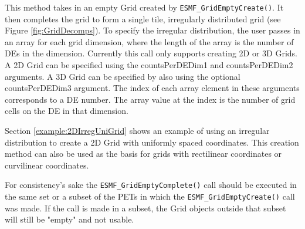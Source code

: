   
   This method takes in an empty Grid created by {\tt ESMF\_GridEmptyCreate()}.
   It then completes the grid to form a single tile, irregularly distributed grid
   (see Figure \ref{fig:GridDecomps}). To specify the irregular distribution, the user passes in an array
   for each grid dimension, where the length of the array is the number
   of DEs in the dimension. Currently this call only
   supports creating 2D or 3D Grids. A 2D Grid can be specified using the
   countsPerDEDim1 and countsPerDEDim2 arguments.  A 3D Grid can
   be specified by also using the optional countsPerDEDim3 argument.
   The index of each array element in these arguments corresponds to
   a DE number.  The array value at the index is the number of grid
   cells on the DE in that dimension.
  
   Section \ref{example:2DIrregUniGrid} shows an example
   of using an irregular distribution to create a 2D Grid with uniformly spaced
   coordinates.  This creation method can also be used as the basis for
   grids with rectilinear coordinates or curvilinear coordinates.
  
   For consistency's sake the {\tt ESMF\_GridEmptyComplete()} call
   should be executed in the same set or a subset of the PETs in which the
   {\tt ESMF\_GridEmptyCreate()} call was made. If the call
   is made in a subset, the Grid objects outside that subset will
   still be "empty" and not usable.
  
